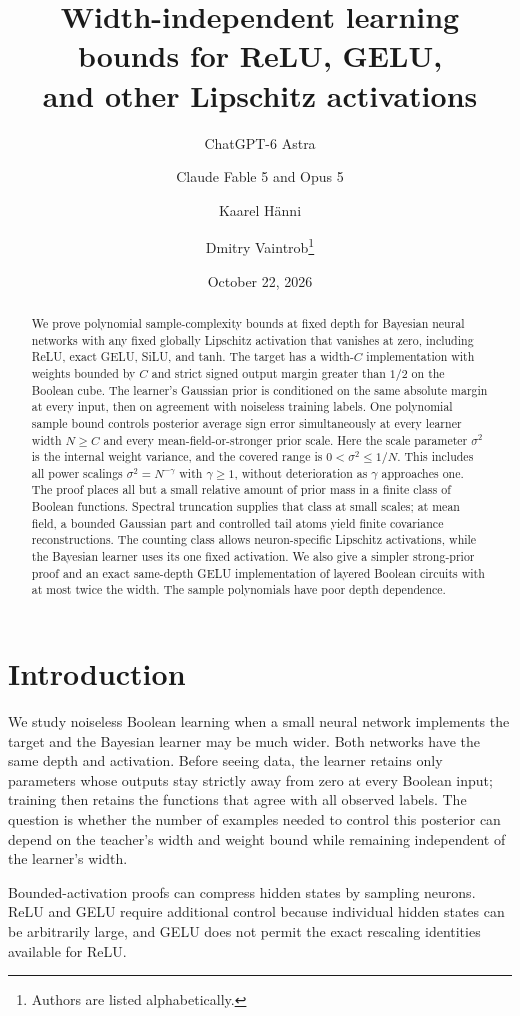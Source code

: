 \documentclass[11pt]{article}
\title{Width-independent learning bounds for ReLU, GELU,\protect\\ and other Lipschitz activations}
\author{ChatGPT-6 Astra \and Claude Fable 5 and Opus 5 \and Kaarel H\"anni \and Dmitry Vaintrob\thanks{Authors are listed alphabetically.}}
\date{October 22, 2026}
\theoremstyle{remark}\newtheorem{remark}[theorem]{Remark}
\begin{document}
\maketitle
\begin{abstract}
We prove polynomial sample-complexity bounds at fixed depth for Bayesian neural networks with any fixed globally Lipschitz activation that vanishes at zero, including ReLU, exact GELU, SiLU, and tanh. The target has a width-$C$ implementation with weights bounded by $C$ and strict signed output margin greater than $1/2$ on the Boolean cube. The learner's Gaussian prior is conditioned on the same absolute margin at every input, then on agreement with noiseless training labels. One polynomial sample bound controls posterior average sign error simultaneously at every learner width $N\ge C$ and every mean-field-or-stronger prior scale. Here the scale parameter $\sigma^2$ is the internal weight variance, and the covered range is $0<\sigma^2\le1/N$. This includes all power scalings $\sigma^2=N^{-\gamma}$ with $\gamma\ge1$, without deterioration as $\gamma$ approaches one. The proof places all but a small relative amount of prior mass in a finite class of Boolean functions. Spectral truncation supplies that class at small scales; at mean field, a bounded Gaussian part and controlled tail atoms yield finite covariance reconstructions. The counting class allows neuron-specific Lipschitz activations, while the Bayesian learner uses its one fixed activation. We also give a simpler strong-prior proof and an exact same-depth GELU implementation of layered Boolean circuits with at most twice the width. The sample polynomials have poor depth dependence.
\end{abstract}

\section{Introduction}
We study noiseless Boolean learning when a small neural network implements the target and the Bayesian learner may be much wider. Both networks have the same depth and activation. Before seeing data, the learner retains only parameters whose outputs stay strictly away from zero at every Boolean input; training then retains the functions that agree with all observed labels. The question is whether the number of examples needed to control this posterior can depend on the teacher's width and weight bound while remaining independent of the learner's width.

Bounded-activation proofs can compress hidden states by sampling neurons. ReLU and GELU require additional control because individual hidden states can be arbitrarily large, and GELU does not permit the exact rescaling identities available for ReLU.
\end{document}
